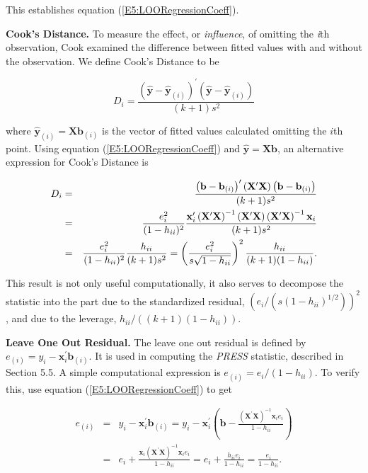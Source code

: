 \noindent This establishes equation (\ref{E5:LOORegressionCoeff}).

\textbf{Cook's Distance.} To measure the effect, or
\textit{influence}, of omitting the \textit{i}th observation, Cook
examined the difference between fitted values with and without the
observation. We define Cook's Distance to be
\begin{center}
\[
D_{i}=\frac{\left( \mathbf{\hat{y}-\hat{y}}_{(i)}\right) ^{\prime }\left(
\mathbf{\hat{y}-\hat{y}}_{(i)}\right) }{(k+1)s^{2}}
\]
\end{center}
where $\mathbf{\hat{y}}_{(i)}=\mathbf{Xb}_{(i)}$ is the vector of
fitted values calculated omitting the $i$th point. Using equation
(\ref{E5:LOORegressionCoeff}) and $\mathbf{\hat{y}}=\mathbf{Xb}$, an
alternative expression for Cook's Distance is
\begin{center}
\begin{eqnarray*}
D_{i} &=&\frac{\left( \mathbf{b-b}_{(i)}\right) ^{\prime }\left( \mathbf{X}%
^{\prime }\mathbf{X}\right) \left( \mathbf{b-b}_{(i)}\right) }{(k+1)s^{2}} \\
&=&\frac{e_{i}^{2}}{(1-h_{ii})^{2}}\frac{\mathbf{x}_{i}^{\prime
}\left( \mathbf{X}^{\prime }\mathbf{X}\right) ^{-1}\left(
\mathbf{X}^{\prime
}\mathbf{X}\right) \left( \mathbf{X}^{\prime }\mathbf{X}\right) ^{-1}\mathbf{%
x}_{i}}{(k+1)s^{2}} \\
&=&\frac{e_{i}^{2}}{(1-h_{ii})^{2}}\frac{h_{ii}}{(k+1)s^{2}}=\left(
\frac{e_{i}^{2}}{s\sqrt{1-h_{ii}}}\right) ^{2}\frac{h_{ii}}{%
(k+1)(1-h_{ii})}.
\end{eqnarray*}
\end{center}
This result is not only useful computationally, it also serves to
decompose
the statistic into the part due to the standardized residual, $\left( e%
_{i}/\left( s\left( 1-h_{ii}\right) ^{1/2}\right) \right) ^{2}$, and
due to the leverage, $h_{ii}/\left( \left( k+1\right) \left(
1-h_{ii}\right) \right) $.


\textbf{Leave One Out Residual.} The leave one out residual is defined by $%
e_{(i)}=y_{i}-\mathbf{x}_{i}^{\prime }\mathbf{b}_{(i)}$. It is used
in computing the \textit{PRESS} statistic, described in Section 5.5.
A simple computational expression is $e_{(i)}=e_{i}/(1-h_{ii})$. To
verify this, use equation (\ref{E5:LOORegressionCoeff}) to get
\begin{center}
\begin{eqnarray*}
e_{(i)} &=&y_{i}-\mathbf{x}_{i}^{\prime }\mathbf{b}_{(i)}=y_{i}-%
\mathbf{x}_{i}^{\prime }\left( \mathbf{b}-\frac{\left( \mathbf{X}^{\prime }%
\mathbf{X}\right) ^{-1}\mathbf{x}_{i}e_{i}}{1-h_{ii}}\right)  \\
&=&e_{i}+\frac{\mathbf{x}_{i}\left( \mathbf{X}^{\prime }\mathbf{X}%
\right)
^{-1}\mathbf{x}_{i}e_{i}}{1-h_{ii}}=e_{i}+\frac{h_{ii}
e_{i}}{1-h_{ii}}=\frac{e_{i}}{1-h_{ii}}.
\end{eqnarray*}
\end{center}

